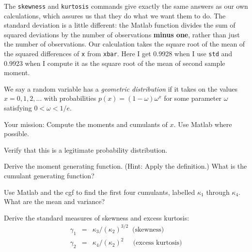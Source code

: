 \documentclass[11pt]{exam}
\begin{document}
\begin{questions}
\begin{solution}
\begin{parts}
\item
The {\tt skewness} and {\tt kurtosis} commands
give exactly the same answers as our own calculations,
which assures us that they do what we want them to do.
The standard deviation is a little different:
the Matlab function divides the
sum of squared deviations by the number of observations {\bf minus one},
rather than just the number of observations.
Our calculation takes the square root of the mean of
the squared differences of {\tt x} from {\tt xbar}.
Here I get 0.9928 when I use {\tt std} and 0.9923 when I compute it
as the square root of the mean of second sample moment.

\end{parts}
\end{solution}

We say a random variable has a {\it geometric distribution\/}
if it takes on the values  $ x = 0,1,2, \ldots$ with probabilities
$ p(x) = (1-\omega) \omega^x$ for some parameter $\omega$
satisfying $0< \omega < 1/e$.

Your mission:  Compute the moments and cumulants of $x$.
Use Matlab where possible.
%
\begin{parts}
\item Verify that this is a legitimate probability distribution.

\item Derive the moment generating function.
(Hint:  Apply the definition.)
What is the cumulant generating function?

\item Use Matlab and the cgf to find the
first four cumulants, labelled $\kappa_1$ through $\kappa_4$.
What are the mean and variance?

\item Derive the standard measures of skewness and excess kurtosis:
\begin{eqnarray*}
    \gamma_1 &=&  \kappa_3 /(\kappa_2)^{3/2}  \;\; \mbox{(skewness)} \\
    \gamma_2 &=&  \kappa_4 /(\kappa_2)^{2}    \;\;\;\;\; \mbox{(excess kurtosis)}
\end{eqnarray*}
\end{parts}


\end{questions}
\end{document}
